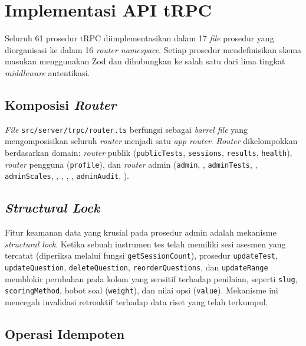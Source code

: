 \section{Implementasi API tRPC}
\label{sec:impl-trpc}

Seluruh 61 prosedur tRPC diimplementasikan dalam 17 \textit{file} prosedur yang diorganisasi ke dalam 16 \textit{router namespace}. Setiap prosedur mendefinisikan skema masukan menggunakan Zod dan dihubungkan ke salah satu dari lima tingkat \textit{middleware} autentikasi.

\subsection{Komposisi \textit{Router}}

\textit{File} \texttt{src/server/trpc/router.ts} berfungsi sebagai \textit{barrel file} yang mengomposisikan seluruh \textit{router} menjadi satu \textit{app router}. \textit{Router} dikelompokkan berdasarkan domain: \textit{router} publik (\texttt{publicTests}, \texttt{sessions}, \texttt{results}, \texttt{health}), \textit{router} pengguna (\texttt{profile}), dan \textit{router} admin (\texttt{admin}, \texttt{}, \texttt{adminTests}, \texttt{}, \texttt{adminScales}, \texttt{}, \texttt{}, \texttt{}, \texttt{}, \texttt{adminAudit}, \texttt{}).

\subsection{\textit{Structural Lock}}

Fitur keamanan data yang krusial pada prosedur admin adalah mekanisme \textit{structural lock}. Ketika sebuah instrumen tes telah memiliki sesi asesmen yang tercatat (diperiksa melalui fungsi \texttt{getSessionCount}), prosedur \texttt{updateTest}, \texttt{updateQuestion}, \texttt{deleteQuestion}, \texttt{reorderQuestions}, dan \texttt{updateRange} memblokir perubahan pada kolom yang sensitif terhadap penilaian, seperti \texttt{slug}, \texttt{scoringMethod}, bobot soal (\texttt{weight}), dan nilai opsi (\texttt{value}). Mekanisme ini mencegah invalidasi retroaktif terhadap data riset yang telah terkumpul.

\subsection{Operasi Idempoten}

